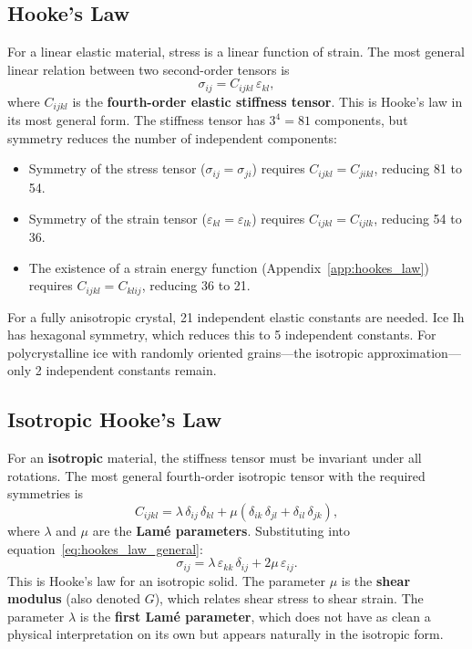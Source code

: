 \documentclass[11pt]{article}
\begin{document}
\subsection{Hooke's Law}
\label{sec:hookes_law}

For a linear elastic material, stress is a linear function of strain.  The most general linear relation between two second-order tensors is
\begin{equation}
  \boxed{\sigma_{ij} = C_{ijkl}\,\varepsilon_{kl},}
  \label{eq:hookes_law_general}
\end{equation}
where $C_{ijkl}$ is the \textbf{fourth-order elastic stiffness tensor}.  This is Hooke's law in its most general form.  The stiffness tensor has $3^4 = 81$ components, but symmetry reduces the number of independent components:
\begin{itemize}
  \item Symmetry of the stress tensor ($\sigma_{ij} = \sigma_{ji}$) requires $C_{ijkl} = C_{jikl}$, reducing 81 to 54.
  \item Symmetry of the strain tensor ($\varepsilon_{kl} = \varepsilon_{lk}$) requires $C_{ijkl} = C_{ijlk}$, reducing 54 to 36.
  \item The existence of a strain energy function (Appendix~\ref{app:hookes_law}) requires $C_{ijkl} = C_{klij}$, reducing 36 to 21.
\end{itemize}
For a fully anisotropic crystal, 21 independent elastic constants are needed.  Ice Ih has hexagonal symmetry, which reduces this to 5 independent constants.  For polycrystalline ice with randomly oriented grains---the isotropic approximation---only 2 independent constants remain.

\subsection{Isotropic Hooke's Law}
\label{sec:isotropic}

For an \textbf{isotropic} material, the stiffness tensor must be invariant under all rotations.  The most general fourth-order isotropic tensor with the required symmetries is
\begin{equation}
  C_{ijkl} = \lambda\,\delta_{ij}\,\delta_{kl} + \mu\!\left(\delta_{ik}\,\delta_{jl} + \delta_{il}\,\delta_{jk}\right),
  \label{eq:isotropic_stiffness}
\end{equation}
where $\lambda$ and $\mu$ are the \textbf{Lam\'{e} parameters}.  Substituting into equation~\eqref{eq:hookes_law_general}:
\begin{equation}
  \boxed{\sigma_{ij} = \lambda\,\varepsilon_{kk}\,\delta_{ij} + 2\mu\,\varepsilon_{ij}.}
  \label{eq:hookes_law_isotropic}
\end{equation}
This is Hooke's law for an isotropic solid.  The parameter $\mu$ is the \textbf{shear modulus} (also denoted $G$), which relates shear stress to shear strain.  The parameter $\lambda$ is the \textbf{first Lam\'{e} parameter}, which does not have as clean a physical interpretation on its own but appears naturally in the isotropic form.
\end{document}
